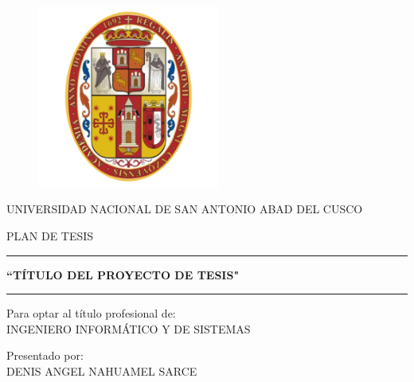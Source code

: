 \documentclass[a4paper,12pt]{report}
\begin{document}
\begin{titlepage}
\begin{center}

\begin{figure}[htb]
	\begin{center}
	\includegraphics[width=6cm]{imagenes/logo.png}
	\end{center}
\end{figure}
\uppercase{universidad nacional de san antonio abad del cusco}


\vspace*{0.40in}
PLAN DE TESIS


\rule[2mm]{14.5cm}{1mm}%

\uppercase{\textbf{``Título del Proyecto de tesis"}}

\rule[0.5mm]{14.5cm}{1mm}%
\vspace*{0.3in}
\end{center}

\vspace*{0.3in}
\begin{flushleft}
	\hspace{4.0cm} Para optar al título profesional de:\\
	\hspace{4.5cm} \uppercase{Ingeniero informático y de sistemas}

	\hspace{4.0cm} Presentado por:\\
	\hspace{4.5cm} \uppercase{ Denis Angel Nahuamel Sarce}


\end{flushleft}
\end{titlepage}
\end{document}
